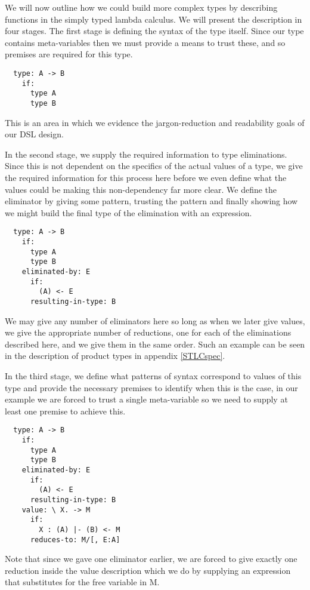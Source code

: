 We will now outline how we could build more complex types by
describing functions in the simply typed lambda calculus. We will
present the description in four stages. The first stage is defining
the syntax of the type itself. Since our type contains meta-variables
then we must provide a means to trust these, and so premises are
required for this type.

\begin{BVerbatim}
  type: A -> B
    if:
      type A
      type B
\end{BVerbatim}

This is an area in which we evidence the jargon-reduction and
readability goals of our DSL design.

In the second stage, we supply the required information to type
eliminations. Since this is not dependent on the specifics of the
actual values of a type, we give the required information for this
process here before we even define what the values could be making
this non-dependency far more clear. We define the eliminator by giving
some pattern, trusting the pattern and finally showing how we might
build the final type of the elimination with an expression.

\begin{BVerbatim}
  type: A -> B
    if:
      type A
      type B
    eliminated-by: E
      if:
        (A) <- E
      resulting-in-type: B
\end{BVerbatim}

We may give any number of eliminators here so long as when we later
give values, we give the appropriate number of reductions, one for
each of the eliminations described here, and we give them in the same
order. Such an example can be seen in the description of product types
in appendix \ref{STLCspec}.

In the third stage, we define what patterns of syntax correspond to
values of this type and provide the necessary premises to identify
when this is the case, in our example we are forced to trust a single
meta-variable so we need to supply at least one premise to achieve
this.

\begin{BVerbatim}
  type: A -> B
    if:
      type A
      type B
    eliminated-by: E
      if:
        (A) <- E
      resulting-in-type: B
    value: \ X. -> M
      if:
        X : (A) |- (B) <- M
      reduces-to: M/[, E:A]
\end{BVerbatim}

Note that since we gave one eliminator earlier, we are forced to give
exactly one reduction inside the value description which we do by
supplying an expression that substitutes for the free variable in M.

